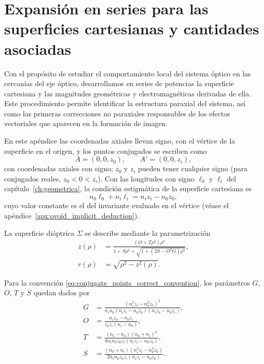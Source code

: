 \chapter{Expansión en series para las superficies cartesianas y cantidades asociadas}
\label{apx:ovoids_series}
\label{sec:series_expansion_cartesian_surfaces}

Con el propósito de estudiar el comportamiento local del sistema óptico en las cercanías del eje óptico, desarrollamos en series de potencias la superficie cartesiana \cite{ovoids2023} y las magnitudes geométricas y electromagnéticas derivadas de ella. Este procedimiento permite identificar la estructura paraxial del sistema, así como las primeras correcciones no paraxiales responsables de los efectos vectoriales que aparecen en la formación de imagen.

En este apéndice las coordenadas axiales llevan signo, con el vértice de la
superficie en el origen, y los puntos conjugados se escriben como
\begin{equation}
A=(0,0,z_0),
\qquad
A'=(0,0,z_i),
\label{eq:conjugate_points_correct_convention}
\end{equation}
con coordenadas axiales con signo; $z_0$ y $z_i$ pueden tener cualquier signo
(para conjugados reales, $z_0<0<z_i$). Con las longitudes con signo $\ell_0$ y
$\ell_i$ del capítulo~\ref{ch:geometrica}, la condición estigmática de la
superficie cartesiana es
\begin{equation}
n_0\ell_0+n_i\ell_i
=
n_iz_i-n_0z_0,
\label{eq:stigmatic_condition_correct_convention}
\end{equation}
cuyo valor constante es el del invariante evaluado en el vértice (véase el
apéndice~\ref{apx:ovoid_implicit_deduction}).

La superficie dióptrica \(\Sigma\) se describe mediante la parametrización
\begin{align}
z(\rho)
&=
\frac{(O+T\rho^2)\rho^2}
{1+S\rho^2+\sqrt{1+(2S-O^2G)\rho^2}},
\label{eq:cartesian_surface_parametrization_z}
\\[6pt]
r(\rho)
&=
\sqrt{\rho^2-z^2(\rho)}.
\label{eq:cartesian_surface_parametrization_r}
\end{align}

Para la convención \eqref{eq:conjugate_points_correct_convention}, los parámetros \(G\), \(O\), \(T\) y \(S\) quedan dados por
\begin{align}
G
&=
\frac{
(n_i^2z_i-n_0^2z_0)^2
}{
n_in_0
(n_iz_i-n_0z_0)
(n_iz_0-n_0z_i)
},
\label{eq:cartesian_parameter_G}
\\[6pt]
O
&=
\frac{
n_iz_0-n_0z_i
}{
z_0z_i(n_i-n_0)
},
\label{eq:cartesian_parameter_O}
\\[6pt]
T
&=
\frac{
(n_i-n_0)(n_0+n_i)^2
}{
4n_in_0z_0z_i(n_iz_i-n_0z_0)
},
\label{eq:cartesian_parameter_T}
\\[6pt]
S
&=
\frac{
(n_0+n_i)(n_i^2z_i-n_0^2z_0)
}{
2n_in_0z_0z_i(n_iz_i-n_0z_0)
}.
\label{eq:cartesian_parameter_S}
\end{align}

